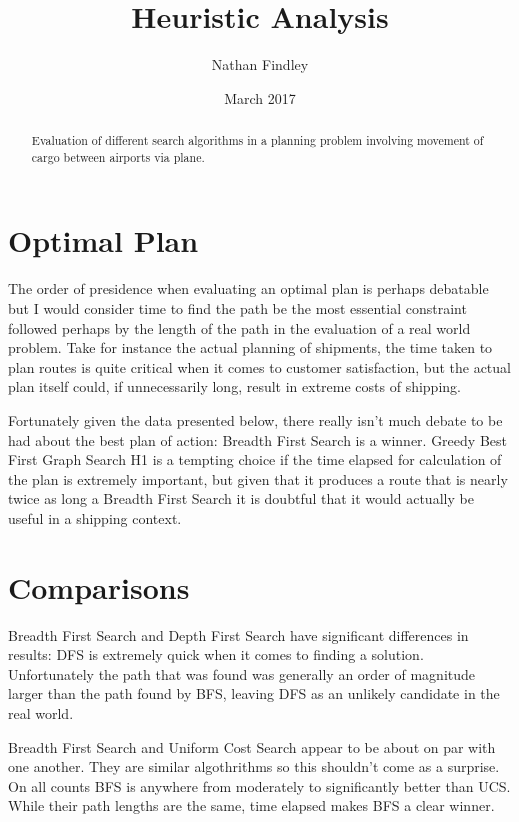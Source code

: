 \documentclass[10pt, a4paper]{article}
\title{Heuristic Analysis}
\author{Nathan Findley}
\date{March 2017}
\begin{document}
\maketitle
\tableofcontents

\begin{abstract}
	Evaluation of different search algorithms in a planning problem involving movement of cargo
	between airports via plane.
\end{abstract}

\section{Optimal Plan}

The order of presidence when evaluating an optimal plan is perhaps debatable
but I would consider time to find the path be the most essential constraint followed
perhaps by the length of the path in the evaluation of a real world problem.  Take for
instance the actual planning of shipments, the time taken to plan routes is quite critical
when it comes to customer satisfaction, but the actual plan itself could, if unnecessarily long,
result in extreme costs of shipping.

Fortunately given the data presented below, there really isn't much debate to be had about the
best plan of action: Breadth First Search is a winner.  Greedy Best First Graph Search H1 is a
tempting choice if the time elapsed for calculation of the plan is extremely important, but given that it produces
a route that is nearly twice as long a Breadth First Search it is doubtful that it would actually
be useful in a shipping context.

\section{Comparisons}

Breadth First Search and Depth First Search have significant differences in results: DFS is extremely quick when it comes to finding a solution.  Unfortunately
the path that was found was generally an order of magnitude larger than the path found by BFS, leaving DFS as an unlikely candidate in the real world.

Breadth First Search and Uniform Cost Search appear to be about on par with one another.  They are similar algothrithms so this shouldn't come as a surprise.
On all counts BFS is anywhere from moderately to significantly better than UCS.  While their path lengths are the same, time elapsed makes BFS a clear winner.
\end{document}
